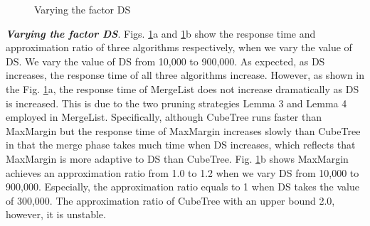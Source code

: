 \begin{figure}[h] \centering
\caption{Varying the factor DS}
\label{F5}
\end{figure}

\textbf{\textit{Varying the factor DS}}. Figs. \ref{F5}a and \ref{F5}b show the response time and approximation ratio of three algorithms respectively, when we vary the value of DS. We vary the value of DS from 10,000 to 900,000. As expected, as DS increases, the response time of all three algorithms increase. However, as shown in the Fig. \ref{F5}a, the response time of MergeList does not increase dramatically as DS is increased. This is due to the two pruning strategies Lemma 3 and Lemma 4 employed in MergeList. Specifically, although CubeTree runs faster than MaxMargin but the response time of MaxMargin increases slowly than CubeTree in that the merge phase takes much time when DS increases, which reflects that MaxMargin is more adaptive to DS than CubeTree. Fig. \ref{F5}b shows MaxMargin achieves an approximation ratio from 1.0 to 1.2 when we vary DS from 10,000 to 900,000. Especially, the approximation ratio equals to 1 when DS takes the value of 300,000. The approximation ratio of CubeTree with an upper bound 2.0, however, it is unstable.


